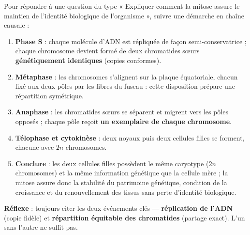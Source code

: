 \documentclass[11pt]{article}
\newcommand{\cle}[1]{{\popxbold\color{popdark}#1}}
\begin{document}
\begin{methode}
Pour répondre à une question du type « Expliquer comment la mitose assure le maintien de l'identité biologique de l'organisme », suivre une démarche en chaîne causale :
\begin{enumerate}
\item \textbf{Phase S} : chaque molécule d'ADN est répliquée de façon \cle{semi-conservatrice} ; chaque chromosome devient formé de deux chromatides sœurs \textbf{génétiquement identiques} (copies conformes).
\item \textbf{Métaphase} : les chromosomes s'alignent sur la plaque équatoriale, chacun fixé aux deux pôles par les fibres du fuseau : cette disposition prépare une répartition symétrique.
\item \textbf{Anaphase} : les chromatides sœurs se séparent et migrent vers les pôles opposés ; chaque pôle reçoit \textbf{un exemplaire de chaque chromosome}.
\item \textbf{Télophase et cytokinèse} : deux noyaux puis deux cellules filles se forment, chacune avec $2n$ chromosomes.
\item \textbf{Conclure} : les deux cellules filles possèdent le même caryotype ($2n$ chromosomes) et la même information génétique que la cellule mère ; la mitose assure donc la \cle{stabilité du patrimoine génétique}, condition de la croissance et du renouvellement des tissus sans perte d'identité biologique.
\end{enumerate}
\textbf{Réflexe} : toujours citer les deux événements clés — \textbf{réplication de l'ADN} (copie fidèle) et \textbf{répartition équitable des chromatides} (partage exact). L'un sans l'autre ne suffit pas.
\end{methode}
\end{document}
